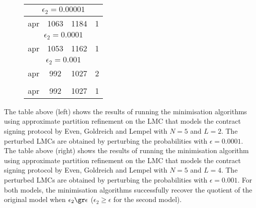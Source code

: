 \begin{figure}[h!]
\begin{floatrow}
{\begin{tabular}{|c|c|c|c|}
				\hline
				\multicolumn{4}{|c|}{$\epsilon_2 = 0.00001$}\\
				\hline
				apr		&  1063	& 1184 &	1\\
				\hline
				\multicolumn{4}{|c|}{$\epsilon_2 = 0.0001$}\\
				\hline
				apr		&  1053	& 1162 &	1\\
				\hline			
				\multicolumn{4}{|c|}{$\epsilon_2 =  0.001$}\\
				\hline
				\rowcolor{yellow}
				apr		 &  992	& 1027	& 2 \\
				\rowcolor{white}
				\hline			
				\multicolumn{4}{|c|}{$\epsilon_2 \in \{0.01,  0.1\}$}\\
				\hline
				\rowcolor{yellow}
				apr		 &  992	& 1027 &	1\\
				\hline
			\end{tabular}	
		}{}
	\end{floatrow}
\end{figure}


The table above (left) shows the results of running the minimisation algorithms using approximate partition refinement on the LMC that models the contract signing protocol by Even, Goldreich and Lempel \cite{EvenGL85} with $N=5$ and $L=2$. The perturbed LMCs are obtained by perturbing the probabilities with $\epsilon = 0.0001$. The table above (right) shows the results of running the minimisation algorithm using approximate partition refinement on the LMC that models the contract signing protocol by Even, Goldreich and Lempel \cite{EvenGL85} with $N=5$ and $L=4$. The perturbed LMCs are obtained by perturbing the probabilities with $\epsilon = 0.001$. For both models, the minimisation algorithms successfully recover the quotient of the original model when $\epsilon_2 \gr \epsilon$ ($\epsilon_2 \ge \epsilon$ for the second model). 

